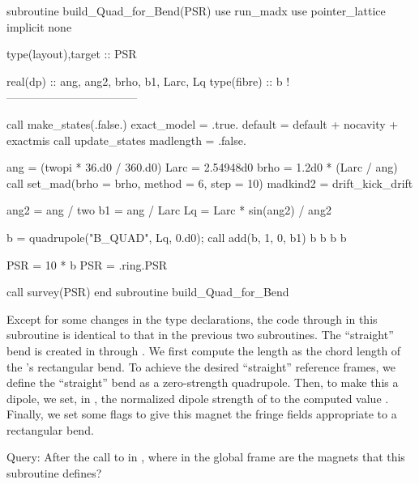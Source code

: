 \begin{ptccode}
subroutine  build_Quad_for_Bend(PSR)
use run_madx
use pointer_lattice
implicit none

type(layout),target :: PSR

real(dp) :: ang, ang2, brho, b1, Larc, Lq
type(fibre) :: b
!-----------------------------------

call make_states(.false.)
exact_model = .true.
default = default + nocavity + exactmis
call update_states
madlength = .false.

ang = (twopi * 36.d0 / 360.d0)
Larc = 2.54948d0
brho = 1.2d0 * (Larc / ang)
call set_mad(brho = brho, method = 6, step = 10)
madkind2 = drift_kick_drift     \label{lin:qfb.same}

ang2 = ang / two                \label{lin:bptc.qfb.bend}
b1 = ang / Larc
Lq = Larc * sin(ang2) / ang2

b = quadrupole("B_QUAD", Lq, 0.d0);
call add(b, 1, 0, b1)           \label{lin:qfb.b1}
b%
b%
b%
b%

PSR = 10 * b
PSR = .ring.PSR

call survey(PSR)                \label{lin:qfb.survey}
end subroutine build_Quad_for_Bend
\end{ptccode}

Except for some changes in the type declarations, the code through
 in this subroutine is identical to that in the
previous two subroutines. The ``straight'' bend is created in
 through . We first
compute the length  as the chord length of the \PSR's
rectangular bend. To achieve the desired ``straight'' reference
frames, we define the ``straight'' bend as a zero-strength
quadrupole. Then, to make this a dipole, we set, in ,
the normalized dipole strength of  to the computed value
. Finally, we set some flags to give this magnet the fringe
fields appropriate to a rectangular bend.

Query: After the call to  in , where
in the global frame are the magnets that this subroutine defines?%


